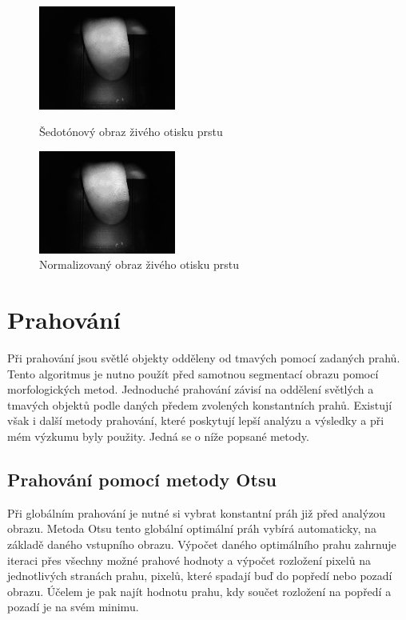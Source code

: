 \begin{figure}[htbp]
  \begin{minipage}[b]{0.5\linewidth}
    \centering
    \includegraphics[width=170px]{obrazky-figures/live87grayscale.png}
    \caption{Šedotónový obraz živého otisku prstu}
  \end{minipage}
  \hspace{0.5cm}
  \begin{minipage}[b]{0.5\linewidth}
    \centering
    \includegraphics[width=170px]{obrazky-figures/live87norm.png}
    \caption{Normalizovaný obraz živého otisku prstu}
  \end{minipage}
\end{figure}



\section{Prahování}
Při prahování jsou světlé objekty odděleny od tmavých pomocí zadaných prahů. Tento algoritmus je nutno použít před samotnou segmentací obrazu pomocí morfologických metod. Jednoduché prahování závisí na oddělení světlých a tmavých objektů podle daných předem zvolených konstantních prahů. Existují však i další metody prahování, které poskytují lepší analýzu a výsledky a při mém výzkumu byly použity. Jedná se o níže popsané metody.

\subsection{Prahování pomocí metody Otsu}
Při globálním prahování je nutné si vybrat konstantní práh již před analýzou obrazu. Metoda Otsu tento globální optimální práh vybírá automaticky, na základě daného vstupního obrazu. \cite{OpenCVTresholding} Výpočet daného optimálního prahu zahrnuje iteraci přes všechny možné prahové hodnoty a výpočet rozložení pixelů na jednotlivých stranách prahu, pixelů, které spadají buď do popředí nebo pozadí obrazu. Účelem je pak najít hodnotu prahu, kdy součet rozložení na popředí a pozadí je na svém minimu. \cite{LabBookPagesTresholding}

